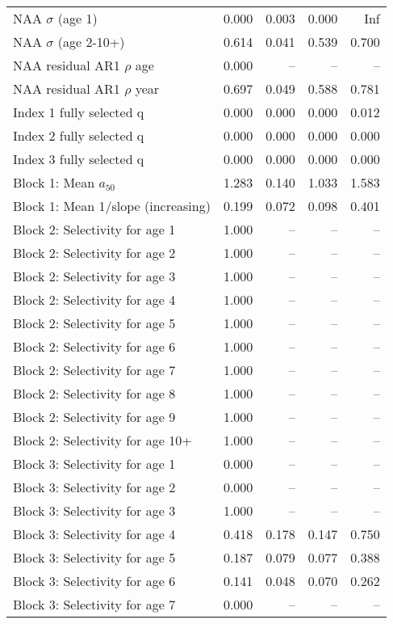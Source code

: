 \documentclass[
]{article}
\begin{document}
\begin{landscape}
\begin{longtable}[t]{lrrrr}
\endfoot
\bottomrule
\endlastfoot
NAA $\sigma$ (age 1) & 0.000 & 0.003 & 0.000 & Inf\\
NAA $\sigma$ (age 2-10+) & 0.614 & 0.041 & 0.539 & 0.700\\
NAA residual AR1 $\rho$ age & 0.000 & -- & -- & --\\
NAA residual AR1 $\rho$ year & 0.697 & 0.049 & 0.588 & 0.781\\
Index 1 fully selected q & 0.000 & 0.000 & 0.000 & 0.012\\
\addlinespace
Index 2 fully selected q & 0.000 & 0.000 & 0.000 & 0.000\\
Index 3 fully selected q & 0.000 & 0.000 & 0.000 & 0.000\\
Block 1: Mean $a_{50}$ & 1.283 & 0.140 & 1.033 & 1.583\\
Block 1: Mean 1/slope (increasing) & 0.199 & 0.072 & 0.098 & 0.401\\
Block 2: Selectivity for age 1 & 1.000 & -- & -- & --\\
\addlinespace
Block 2: Selectivity for age 2 & 1.000 & -- & -- & --\\
Block 2: Selectivity for age 3 & 1.000 & -- & -- & --\\
Block 2: Selectivity for age 4 & 1.000 & -- & -- & --\\
Block 2: Selectivity for age 5 & 1.000 & -- & -- & --\\
Block 2: Selectivity for age 6 & 1.000 & -- & -- & --\\
\addlinespace
Block 2: Selectivity for age 7 & 1.000 & -- & -- & --\\
Block 2: Selectivity for age 8 & 1.000 & -- & -- & --\\
Block 2: Selectivity for age 9 & 1.000 & -- & -- & --\\
Block 2: Selectivity for age 10+ & 1.000 & -- & -- & --\\
Block 3: Selectivity for age 1 & 0.000 & -- & -- & --\\
\addlinespace
Block 3: Selectivity for age 2 & 0.000 & -- & -- & --\\
Block 3: Selectivity for age 3 & 1.000 & -- & -- & --\\
Block 3: Selectivity for age 4 & 0.418 & 0.178 & 0.147 & 0.750\\
Block 3: Selectivity for age 5 & 0.187 & 0.079 & 0.077 & 0.388\\
Block 3: Selectivity for age 6 & 0.141 & 0.048 & 0.070 & 0.262\\
\addlinespace
Block 3: Selectivity for age 7 & 0.000 & -- & -- & --\\

\end{longtable}
\end{landscape}
\end{document}
